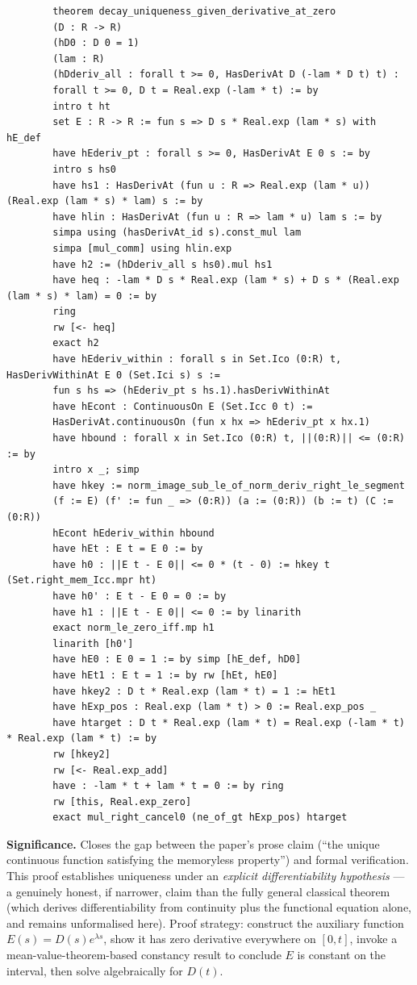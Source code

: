 \documentclass[11pt,a4paper]{article}
\begin{document}
	\begin{lstlisting}
		theorem decay_uniqueness_given_derivative_at_zero
		(D : R -> R)
		(hD0 : D 0 = 1)
		(lam : R)
		(hDderiv_all : forall t >= 0, HasDerivAt D (-lam * D t) t) :
		forall t >= 0, D t = Real.exp (-lam * t) := by
		intro t ht
		set E : R -> R := fun s => D s * Real.exp (lam * s) with hE_def
		have hEderiv_pt : forall s >= 0, HasDerivAt E 0 s := by
		intro s hs0
		have hs1 : HasDerivAt (fun u : R => Real.exp (lam * u)) (Real.exp (lam * s) * lam) s := by
		have hlin : HasDerivAt (fun u : R => lam * u) lam s := by
		simpa using (hasDerivAt_id s).const_mul lam
		simpa [mul_comm] using hlin.exp
		have h2 := (hDderiv_all s hs0).mul hs1
		have heq : -lam * D s * Real.exp (lam * s) + D s * (Real.exp (lam * s) * lam) = 0 := by
		ring
		rw [<- heq]
		exact h2
		have hEderiv_within : forall s in Set.Ico (0:R) t, HasDerivWithinAt E 0 (Set.Ici s) s :=
		fun s hs => (hEderiv_pt s hs.1).hasDerivWithinAt
		have hEcont : ContinuousOn E (Set.Icc 0 t) :=
		HasDerivAt.continuousOn (fun x hx => hEderiv_pt x hx.1)
		have hbound : forall x in Set.Ico (0:R) t, ||(0:R)|| <= (0:R) := by
		intro x _; simp
		have hkey := norm_image_sub_le_of_norm_deriv_right_le_segment
		(f := E) (f' := fun _ => (0:R)) (a := (0:R)) (b := t) (C := (0:R))
		hEcont hEderiv_within hbound
		have hEt : E t = E 0 := by
		have h0 : ||E t - E 0|| <= 0 * (t - 0) := hkey t (Set.right_mem_Icc.mpr ht)
		have h0' : E t - E 0 = 0 := by
		have h1 : ||E t - E 0|| <= 0 := by linarith
		exact norm_le_zero_iff.mp h1
		linarith [h0']
		have hE0 : E 0 = 1 := by simp [hE_def, hD0]
		have hEt1 : E t = 1 := by rw [hEt, hE0]
		have hkey2 : D t * Real.exp (lam * t) = 1 := hEt1
		have hExp_pos : Real.exp (lam * t) > 0 := Real.exp_pos _
		have htarget : D t * Real.exp (lam * t) = Real.exp (-lam * t) * Real.exp (lam * t) := by
		rw [hkey2]
		rw [<- Real.exp_add]
		have : -lam * t + lam * t = 0 := by ring
		rw [this, Real.exp_zero]
		exact mul_right_cancel0 (ne_of_gt hExp_pos) htarget
	\end{lstlisting}
	
	\noindent\textbf{Significance.} Closes the gap between the paper's prose claim (``the unique continuous function satisfying the memoryless property'') and formal verification. This proof establishes uniqueness under an \emph{explicit differentiability hypothesis} --- a genuinely honest, if narrower, claim than the fully general classical theorem (which derives differentiability from continuity plus the functional equation alone, and remains unformalised here). Proof strategy: construct the auxiliary function $E(s) = D(s)e^{\lambda s}$, show it has zero derivative everywhere on $[0,t]$, invoke a mean-value-theorem-based constancy result to conclude $E$ is constant on the interval, then solve algebraically for $D(t)$.
	
\end{document}
